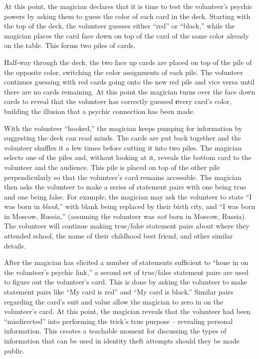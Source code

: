 At this point, the magician declares
that it is time to test the volunteer's psychic powers by asking them to
guess the color of each card in the deck.  Starting with the top of the deck,
the volunteer guesses either ``red'' or ``black,''  while the magician
places the card face down on top of the card of the same
color already on the table.
This forms two piles of cards.

Half-way through the deck,
the two face up cards are placed on top of the
pile of the opposite color, switching the color assignments of
each pile.
The volunteer continues guessing
with red cards going onto the new red pile and vice versa
until
there are no cards remaining.
At this point the magician turns over the face
down cards to reveal that the volunteer has correctly guessed {\textbf every}
card's color, building the illusion that a psychic connection has been made.

With the volunteer ``hooked,'' the magician keeps pumping for information by
suggesting the deck can read minds.
The cards are put back together
and the volunteer shuffles it
a few times before cutting it into two piles.
The magician
selects one of the piles and, without looking at it,
reveals the bottom card to the volunteer and the
audience.
This pile is placed on top of the other pile perpendicularly so that
the volunteer's card remains accessible.  The magician then asks the volunteer to
make a series of statement pairs with one being true and one being false.  For
example,  the magician may ask the volunteer to state  ``I was born in
\textit{blank},'' with blank being replaced by their birth city, and ``I was
born in Moscow, Russia,'' (assuming the volunteer was \textit{not} born in Moscow,
Russia).  The volunteer will continue making true/false
statement pairs about where they attended school, the name
of their childhood best friend, and other similar details. 

After the magician has elicited a number of statements sufficient to
``hone in on the volunteer's psychic link,''
a second set of true/false statement pairs are used
to figure out the volunteer's card.  This is done by asking the volunteer to make
statement pairs like ``My card is red'' and ``My card is black.''  Similar
pairs regarding the card's suit and value allow the magician to zero
in on the volunteer's card.
At this point, the magician reveals that the volunteer had been
``misdirected'' into performing the trick's true purpose -- revealing
personal information.  This creates a teachable moment for discussing
the types of information that can be used in identity theft attempts
should they
be made public.

